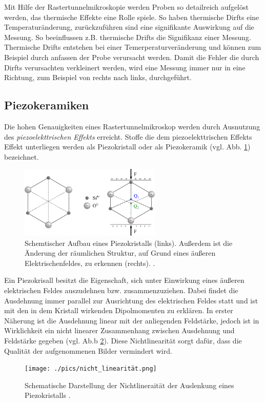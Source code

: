Mit Hilfe der Rastertunnelmikroskopie werden Proben so detailreich aufgelöst werden, das thermische Effekte eine Rolle spiele.
So haben thermische Dirfts  eine Temperaturänderung,  zurückzuführen sind eine signifikante Auswirkung auf die Messung.
So beeinflussen z.B. thermische Drifts die Signifikanz einer Messung.
Thermische Drifts entstehen bei einer Temerperaturveränderung und können zum Beispiel
durch anfassen der Probe verursacht werden.
Damit die Fehler die durch Dirfts verursachten verkleinert werden,
wird eine Messung immer nur in eine Richtung, zum Beispiel von rechts nach links, durchgeführt.

\subsection{Piezokeramiken}

Die hohen Genauigkeiten eines Rastertunnelmikroskop werden durch Ausnutzung des
\emph{piezoelekttrischen Effekts} erreicht.
Stoffe die dem piezoelekttrischen Effekts Effekt unterliegen werden als Piezokristall
oder als Piezokeramik (vgl. Abb. \ref{fig: piezo}) bezeichnet.
\begin{figure}[!h]
  \centering
  \includegraphics[width=0.6\textwidth]{./pics/piezo.png}
  \caption{Schemtischer Aufbau eines Piezokristalls (links). Außerdem ist die Änderung der räumlichen Struktur, auf Grund eines
  äußeren Elektrischenfeldes, zu erkennen (rechts). \cite{piezo}.}
  \label{fig: piezo}
\end{figure}
Ein Piezokrisall besitzt die Eigenschaft, sich unter Einwirkung eines äußeren
elektrischen Feldes auszudehnen bzw. zusammenzuziehen. Dabei findet die Ausdehnung immer parallel zur
Ausrichtung des elektrischen Feldes statt und ist mit den in dem Kristall wirkenden
Dipolmomenten zu erklären. In erster Näherung ist die Ausdehnung linear mit der anliegenden Feldstärke,
jedoch ist in Wirklichkeit ein nicht linearer Zusammenhang zwischen Ausdehnung und Feldstärke
gegeben (vgl. Ab.b \ref{fig: non_linear}). Diese Nichtlinearität sorgt dafür, dass die Qualität der aufgenommenen Bilder
vermindert wird.
\begin{figure}[!h]
  \centering
  \texttt{[image: ./pics/nicht\_linearität.png]}
  \caption{Schematische Darstellung der Nichtlineraität der Auslenkung eines Piezokristalls \cite{rtm}.}
  \label{fig: non_linear}
\end{figure}

